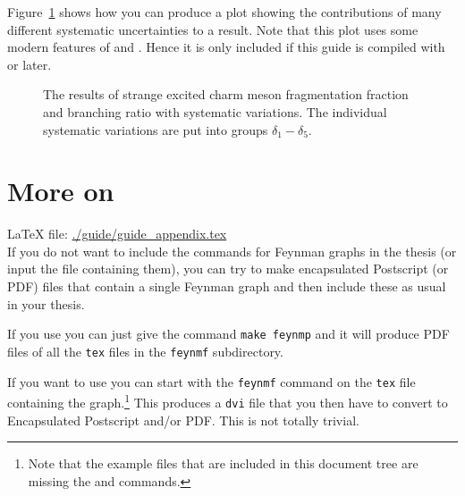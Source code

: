 Figure~\ref{fig:tikz:syst} shows how you can produce a plot showing
the contributions of many different systematic uncertainties to a
result. Note that this plot uses some modern features of
 and . Hence it is only included if
this guide is compiled with  or later.

\newcommand{\fcsone}{\ensuremath{f(c \rightarrow D_{s 1}^+)}}
\newcommand{\BranStrangeLOW}{\ensuremath{\mathcal{B}_{D_{s1}^{+} \rightarrow D^{*+} K^0_S}/\mathcal{B}_{D_{s1}^{+} \rightarrow D^{*0} K^+}}\xspace}

\begin{figure}[htbp]
  \centering
   {%
  }{%
    
  }
  \caption[Strange $D^{**}$ systematics, fragmentation fractions]{The
    results of strange excited charm meson fragmentation fraction and
    branching ratio with systematic variations.  The individual
    systematic variations are put into groups $\delta_1-\delta_5$.}
  \label{fig:tikz:syst}
\end{figure}


\chapter{More on }
\label{sec:app:feynmf}

\LaTeX{} file: \url{./guide/guide_appendix.tex}\\[1ex]
\noindent
If you do not want to include the  commands for Feynman
graphs in the thesis (or input the file containing them), you can try
to make encapsulated Postscript (or PDF) files that contain a single
Feynman graph and then include these as usual in your thesis.

If you use  you can just give the command \texttt{make
feynmp} and it will produce PDF files of all the \texttt{tex} files in
the \texttt{feynmf} subdirectory.

If you want to use  you can start with the
\texttt{feynmf} command on the \texttt{tex} file containing the
graph.\footnote{Note that the example files that are included in this
  document tree are missing the  and
   commands.}  This produces a \texttt{dvi} file
that you then have to convert to Encapsulated Postscript and/or
PDF. This is not totally trivial.

